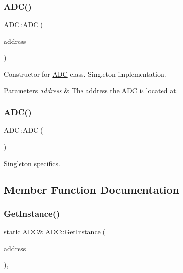 \subsubsection{\texorpdfstring{A\+D\+C()}{ADC()}\hspace{0.1cm}{\footnotesize\ttfamily [1/2]}}
{\footnotesize\ttfamily A\+D\+C\+::\+A\+DC (\begin{DoxyParamCaption}\item[{uint8\+\_\+t $\ast$}]{address }\end{DoxyParamCaption})\hspace{0.3cm}{\ttfamily [private]}}

Constructor for \hyperlink{class_a_d_c}{A\+DC} class. Singleton implementation.


\begin{DoxyParams}{Parameters}
{\em address} & The address the \hyperlink{class_a_d_c}{A\+DC} is located at. \\
\hline
\end{DoxyParams}
\hypertarget{class_a_d_c_a50cb1d4e5bb8e3812732d9efdde4af67}{}\label{class_a_d_c_a50cb1d4e5bb8e3812732d9efdde4af67} 
\subsubsection{\texorpdfstring{A\+D\+C()}{ADC()}\hspace{0.1cm}{\footnotesize\ttfamily [2/2]}}
{\footnotesize\ttfamily A\+D\+C\+::\+A\+DC (\begin{DoxyParamCaption}\item[{const \hyperlink{class_a_d_c}{A\+DC} \&}]{ }\end{DoxyParamCaption})\hspace{0.3cm}{\ttfamily [delete]}}

Singleton specifics. 

\subsection{Member Function Documentation}
\hypertarget{class_a_d_c_a08b7fedaf7538612368312d6d656009d}{}\label{class_a_d_c_a08b7fedaf7538612368312d6d656009d} 
\subsubsection{\texorpdfstring{Get\+Instance()}{GetInstance()}}
{\footnotesize\ttfamily static \hyperlink{class_a_d_c}{A\+DC}\& A\+D\+C\+::\+Get\+Instance (\begin{DoxyParamCaption}\item[{uint8\+\_\+t $\ast$}]{address }\end{DoxyParamCaption})\hspace{0.3cm}{\ttfamily [inline]}, {\ttfamily [static]}}

